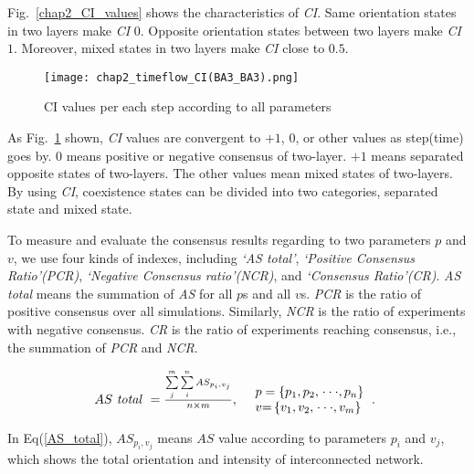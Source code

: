 Fig.~\ref{chap2_CI_values} shows the characteristics of \textit{CI}. Same orientation states in two layers make \textit{CI} $0$. Opposite orientation states between two layers make \textit{CI} $1$. Moreover, mixed states in two layers make \textit{CI} close to $0.5$.

\begin{figure}[!htb]
	\centering
	\texttt{[image: chap2\_timeflow\_CI(BA3\_BA3).png]}
	\caption{CI values per each step according to all parameters}
	\label{chap2_timeflow_CI(BA3_BA3)}
\end{figure}

As Fig.~\ref{chap2_timeflow_CI(BA3_BA3)} shown, \textit{CI} values are convergent to $+1$, $0$, or other values as step(time) goes by. $0$ means positive or negative consensus of two-layer. $+1$ means separated opposite states of two-layers. The other values mean mixed states of two-layers. By using \textit{CI}, coexistence states can be divided into two categories, separated state and mixed state. 

To measure and evaluate the consensus results regarding to two parameters $p$ and $v$, we use four kinds of indexes, including \textit{`AS total'}, \textit{`Positive Consensus Ratio'(PCR)}, \textit{`Negative Consensus ratio'(NCR)}, and \textit{`Consensus Ratio'(CR)}. \textit{AS total} means the summation of \textit{AS} for all $p$s and all $v$s. \textit{PCR} is the ratio of positive consensus over all simulations. Similarly, \textit{NCR} is the ratio of experiments with negative consensus. \textit{CR} is the ratio of experiments reaching consensus, i.e., the summation of \textit{PCR} and \textit{NCR}.

\begin{equation}
\begin{array}{cl}
AS\mbox{ \textit{total} } = \frac{{\sum\limits_j^m {\sum\limits_i^n {A{S_{{p _i},{v _j}}}} } }}{{n \times m }}, &
\begin{array}{l}
p  = \left\{ {{p _{\rm{1}}},{p _{\rm{2}}},\left. {\cdot\cdot\cdot,{p _n}} \right\}} \right.\\
v {\rm{ = }}\left\{ {{v _{\rm{1}}},{v _{\rm{2}}},\left. {\cdot\cdot\cdot,{v _m}} \right\}} \right.
\end{array}.\
\end{array}
\label{AS_total}
\end{equation}

In Eq(\ref{AS_total}), ${A{S_{{p _i},{v _j}}}}$ means $AS$ value according to parameters $p_i$ and $v_j$, which shows the total orientation and intensity of interconnected network.

